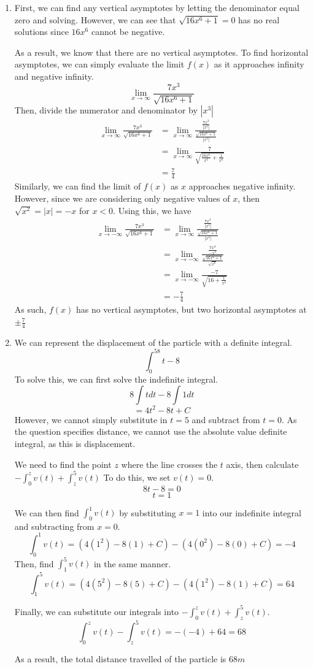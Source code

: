 \documentclass[11pt, letterpaper, twoside]{article}
\begin{document}
\begin{enumerate}
\item %
First, we can find any vertical asymptotes by letting the denominator equal zero and solving.
However, we can see that \(\sqrt{16x^6+1}=0\) has no real solutions since \(16x^6\) cannot be negative.

As a result, we know that there are no vertical asymptotes. 
To find horizontal asymptotes, we can simply evaluate the limit \(f(x)\) as it approaches infinity and negative infinity.
\[\lim_{x\to\infty}\frac{7x^3}{\sqrt{16x^6+1}}\]
Then, divide the numerator and denominator by \(|x^3|\)
\begin{align*}
\lim_{x\to\infty}\frac{7x^3}{\sqrt{16x^6+1}}&=\lim_{x\to\infty}\frac{\frac{7x^3}{|x^3|}}{\frac{\sqrt{16x^6+1}}{|x^3|}}\\
&=\lim_{x\to\infty}\frac{7}{\sqrt{\frac{16x^6}{x^6}+\frac{1}{x^6}}}\\
&=\frac{7}{4}
\end{align*}
Similarly, we can find the limit of \(f(x)\) as \(x\) approaches negative infinity.
However, since we are considering only negative values of \(x\), then \(\sqrt{x^2}=|x|=-x\) for \(x<0\).
Using this, we have 
\begin{align*}
\lim_{x\to-\infty}\frac{7x^3}{\sqrt{16x^6+1}}&=\lim_{x\to\infty}\frac{\frac{7x^3}{|x^3|}}{\frac{\sqrt{16x^6+1}}{|x^3|}}\\
&=\lim_{x\to-\infty}\frac{\frac{7x^3}{-x^3}}{\frac{\sqrt{16x^6+1}}{\sqrt{x^6}}}\\
&=\lim_{x\to-\infty}\frac{-7}{\sqrt{16+\frac{1}{x^6}}}\\
&=-\frac{7}{4}
\end{align*}
As such, \(f(x)\) has no vertical asymptotes, but two horizontal asymptotes at \(\boxed{\pm\frac{7}{4}}\)

\item %
We can represent the displacement of the particle with a definite integral.
\[\int_0^58t-8\]
To solve this, we can first solve the indefinite integral.
\[8\int tdt-8\int1dt\]
\[=4t^2-8t+C\]
However, we cannot simply substitute in \(t=5\) and subtract from \(t=0\). 
As the question specifies distance, we cannot use the absolute value definite integral, as this is displacement.

We need to find the point \(z\) where the line crosses the \(t\) axis, then calculate \(-\int_0^zv(t)+\int_z^5v(t)\)
To do this, we set \(v(t)=0\).
\[8t-8=0\]
\[t=1\]

We can then find \(\int_0^1v(t)\) by substituting \(x=1\) into our indefinite integral and subtracting from \(x=0.\)
\[\int_0^1v(t)=(4(1^2)-8(1)+C)-(4(0^2)-8(0)+C)=-4\]
Then, find \(\int_1^5v(t)\) in the same manner.
\[\int_1^5v(t)=(4(5^2)-8(5)+C)-(4(1^2)-8(1)+C)=64\]

Finally, we can substitute our integrals into \(-\int_0^zv(t)+\int_z^5v(t)\).
\[\int_0^zv(t)-\int_z^5v(t)=-(-4)+64=68\]

As a result, the total distance travelled of the particle is \(\boxed{68m}\)
\end{enumerate}
\end{document}

